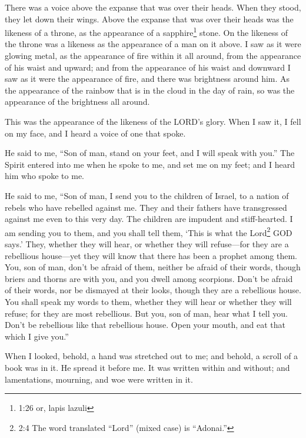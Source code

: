 \myverse{}There was a voice above the expanse that was over their heads.
When they stood, they let down their wings.
\myverse{}Above the expanse that was over their heads was the likeness of a throne,
as the appearance of a sapphire\footnote{1:26 or, lapis lazuli} stone. On the likeness of the throne was a likeness as the appearance
of a man on it above.
\myverse{}I saw as it were glowing metal, as the appearance of fire within it all around,
from the appearance of his waist and upward; and from the appearance of his waist and downward I saw as
it were the appearance of fire, and there was brightness around him.
\myverse{}As the appearance of the rainbow that is in the cloud in the day of rain,
so was the appearance of the brightness all around.

This was the appearance of the likeness of the LORD’s glory. When I saw it, I fell on my
face, and I heard a voice of one that spoke.


\mychapter{} \myverse*{}He said to me, “Son of man, stand on your feet, and I will speak
with you.”
\myverse{}The Spirit entered into me when he spoke to me, and set me on my feet; and I
heard him who spoke to me.

\myverse{}He said to me, “Son of man, I send you to the children of Israel,
to a nation of rebels who have rebelled against me. They and their fathers have transgressed against me
even to this very day.
\myverse{}The children are impudent and stiff-hearted. I am sending you to them, and you
shall tell them, ‘This is what the Lord\footnote{2:4 The word translated “Lord” (mixed case) is “Adonai.”} GOD says.’
\myverse{}They, whether they will hear, or whether they will refuse—for they are a rebellious
house—yet they will know that there has been a prophet among them.
\myverse{}You, son of man, don’t be afraid of them, neither be afraid of their words,
though briers and thorns are with you, and you dwell among scorpions. Don’t be afraid of their words,
nor be dismayed at their looks, though they are a rebellious house.
\myverse{}You shall speak my words to them, whether they will hear or whether they will
refuse; for they are most rebellious.
\myverse{}But you, son of man, hear what I tell you. Don’t be rebellious like that rebellious
house. Open your mouth, and eat that which I give you.”

\myverse{}When I looked, behold, a hand was stretched out to me; and behold,
a scroll of a book was in it.
\myverse{}He spread it before me. It was written within and without; and lamentations,
mourning, and woe were written in it.


